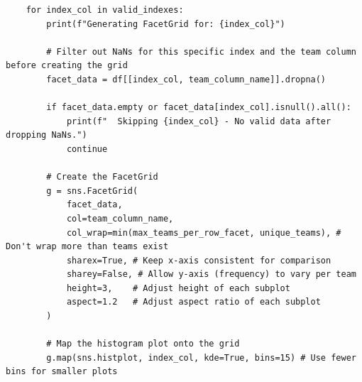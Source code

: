 \documentclass[12pt]{report}
\begin{document}
{\begin{lstlisting}
    for index_col in valid_indexes:
        print(f"Generating FacetGrid for: {index_col}")

        # Filter out NaNs for this specific index and the team column before creating the grid
        facet_data = df[[index_col, team_column_name]].dropna()

        if facet_data.empty or facet_data[index_col].isnull().all():
            print(f"  Skipping {index_col} - No valid data after dropping NaNs.")
            continue

        # Create the FacetGrid
        g = sns.FacetGrid(
            facet_data,
            col=team_column_name,
            col_wrap=min(max_teams_per_row_facet, unique_teams), # Don't wrap more than teams exist
            sharex=True, # Keep x-axis consistent for comparison
            sharey=False, # Allow y-axis (frequency) to vary per team
            height=3,    # Adjust height of each subplot
            aspect=1.2   # Adjust aspect ratio of each subplot
        )

        # Map the histogram plot onto the grid
        g.map(sns.histplot, index_col, kde=True, bins=15) # Use fewer bins for smaller plots


\end{lstlisting}}
\end{document}
